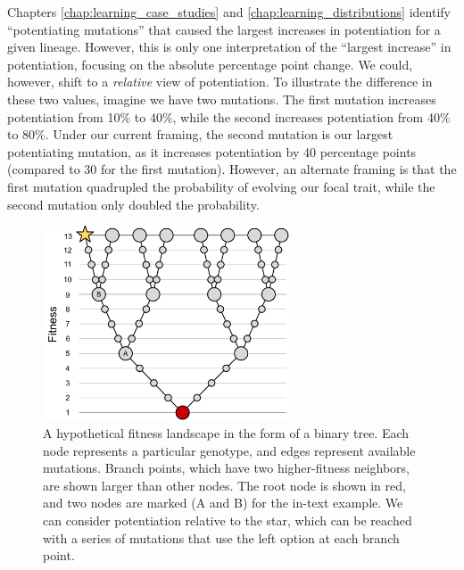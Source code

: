 Chapters \ref{chap:learning_case_studies} and \ref{chap:learning_distributions} identify ``potentiating mutations'' that caused the largest increases in potentiation for a given lineage. 
However, this is only one interpretation of the ``largest increase'' in potentiation, focusing on the absolute percentage point change. 
We could, however, shift to a \textit{relative} view of potentiation. 
To illustrate the difference in these two values, imagine we have two mutations. 
The first mutation increases potentiation from 10\% to 40\%, while the second increases potentiation from 40\% to 80\%. 
Under our current framing, the second mutation is our largest potentiating mutation, as it increases potentiation by 40 percentage points (compared to 30 for the first mutation). 
However, an alternate framing is that the first mutation quadrupled the probability of evolving our focal trait, while the second mutation only doubled the probability. 

\begin{figure}[h!]
\begin{center}
\includegraphics[width=0.65\textwidth]{06_conclusion/media/bst.pdf}
\end{center}
\caption{ 
A hypothetical fitness landscape in the form of a binary tree. 
Each node represents a particular genotype, and edges represent available mutations. 
Branch points, which have two higher-fitness neighbors, are shown larger than other nodes. 
The root node is shown in red, and two nodes are marked (A and B) for the in-text example. 
We can consider potentiation relative to the star, which can be reached with a series of mutations that use the left option at each branch point. 
}\label{fig:conclusion_binary_tree}
\end{figure}

